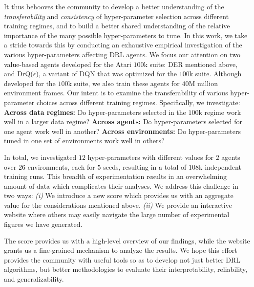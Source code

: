 It thus behooves the community to develop a better understanding of the {\em transferability} and {\em consistency} of hyper-parameter selection across different training regimes, and to build a better shared understanding of the relative importance of the many possible hyper-parameters to tune. In this work, we take a stride towards this by conducting an exhaustive empirical investigation of the various hyper-parameters affecting DRL agents. We focus our attention on two value-based agents developed for the Atari $100$k suite: DER mentioned above, and DrQ($\epsilon$), a variant of DQN that was optimized for the $100$k suite. Although developed for the $100$k suite, we also train these agents for $40$M million environment frames. Our intent is to examine the transferability of various hyper-parameter choices across different training regimes. Specifically, we investigate:
{\bf Across data regimes:} Do hyper-parameters selected in the $100$k regime work well in a larger data regime? {\bf Across agents:} Do hyper-parameters selected for one agent work well in another? {\bf Across environments:} Do hyper-parameters tuned in one set of environments work well in others?

In total, we investigated $12$ hyper-parameters with different values for $2$ agents over $26$ environments, each for $5$ seeds, resulting in a total of $108$k independent training runs. This breadth of experimentation results in an overwhelming amount of data which complicates their analyses. We address this challenge in two ways: \textit{(i)} We introduce a new score which provides us with an aggregate value for the considerations mentioned above. \textit{(ii)} We provide an interactive website where others may easily navigate the large number of experimental figures we have generated.

The score provides us with a high-level overview of our findings, while the website grants us a fine-grained mechanism to analyze the results. We hope this effort provides the community with useful tools so as to develop not just better DRL algorithms, but better methodologies to evaluate their interpretability, reliability, and generalizability.